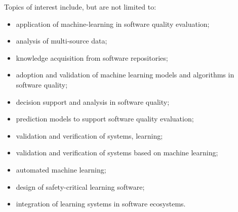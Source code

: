 Topics of interest include, but are not limited to:
\begin{itemize}
    \item application of machine-learning in software quality evaluation;
    \item analysis of multi-source data;
    \item knowledge acquisition from software repositories;
    \item adoption and validation of machine learning models and algorithms in software quality;
    \item decision support and analysis in software quality;
    \item prediction models to support software quality evaluation;
    \item validation and verification of systems, learning;
    \item validation and verification of systems based on machine learning;
    \item automated machine learning;
    \item design of safety-critical learning software;
    \item integration of learning systems in software ecosystems.
\end{itemize}
